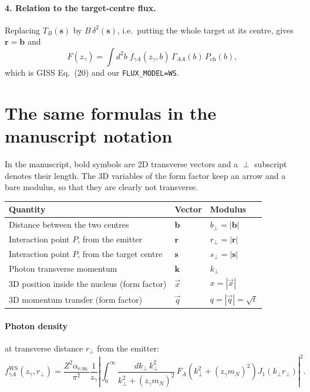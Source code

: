 \documentclass[11pt]{article}
\begin{document}
\paragraph{4. Relation to the target-centre flux.} Replacing $T_B(\mathbf s)$ by
$B\,\delta^2(\mathbf s)$, i.e.\ putting the whole target at its centre, gives $\mathbf r=\mathbf b$
and
\begin{equation}
  F(z_\gamma)=\int d^2b\;f_{\gamma A}(z_\gamma,b)\,\Gamma_{AA}(b)\,P_{\text{ch}}(b),
\end{equation}
which is GISS Eq.~(20) and our \texttt{FLUX\_MODEL=WS}.

\section{The same formulas in the manuscript notation}

In the manuscript, bold symbols are 2D transverse vectors and a $\perp$ subscript denotes their
length. The 3D variables of the form factor keep an arrow and a bare modulus, so that they are
clearly not transverse.

\begin{center}
\begin{tabular}{lll}
\toprule
Quantity & Vector & Modulus \\
\midrule
Distance between the two centres & $\mathbf b$ & $b_\perp=|\mathbf b|$ \\
Interaction point $P$, from the emitter & $\mathbf r$ & $r_\perp=|\mathbf r|$ \\
Interaction point $P$, from the target centre & $\mathbf s$ & $s_\perp=|\mathbf s|$ \\
Photon transverse momentum & $\mathbf k$ & $k_\perp$ \\
3D position inside the nucleus (form factor) & $\vec x$ & $x=|\vec x|$ \\
3D momentum transfer (form factor) & $\vec q$ & $q=|\vec q|=\sqrt t$ \\
\bottomrule
\end{tabular}
\end{center}

\paragraph{Photon density} at transverse distance $r_\perp$ from the emitter:
\begin{equation}
  f^{\text{WS}}_{\gamma A}(z_\gamma,r_\perp)=\frac{Z^2\alpha_{\text{e.m.}}}{\pi^2}\frac{1}{z_\gamma}
  \left|\int_0^\infty\frac{dk_\perp\,k_\perp^2}{k_\perp^2+(z_\gamma m_N)^2}\,
  F_A\!\left(k_\perp^2+(z_\gamma m_N)^2\right)J_1(k_\perp r_\perp)\right|^2 .
\end{equation}
\end{document}
